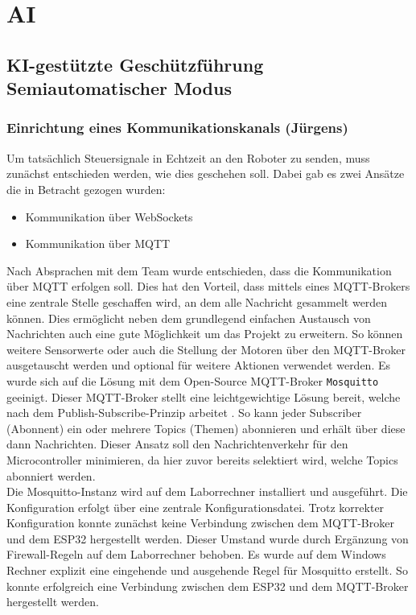 \chapter{AI}

\section{KI-gestützte Geschützführung Semiautomatischer Modus}
\subsection{Einrichtung eines Kommunikationskanals (Jürgens)}
Um tatsächlich Steuersignale in Echtzeit an den Roboter zu senden, muss zunächst entschieden werden, wie dies geschehen soll. Dabei gab es zwei Ansätze die in Betracht gezogen wurden: 
\begin{itemize}
    \item Kommunikation über WebSockets
    \item Kommunikation über MQTT
\end{itemize}
Nach Absprachen mit dem Team wurde entschieden, dass die Kommunikation über MQTT erfolgen soll. Dies hat den Vorteil, dass mittels eines MQTT-Brokers eine zentrale Stelle geschaffen wird, an dem alle Nachricht gesammelt werden können. Dies ermöglicht neben dem grundlegend einfachen Austausch von Nachrichten auch eine gute Möglichkeit um das Projekt zu erweitern. So können weitere Sensorwerte oder auch die Stellung der Motoren über den MQTT-Broker ausgetauscht werden und optional für weitere Aktionen verwendet werden. Es wurde sich auf die Lösung mit dem Open-Source MQTT-Broker \texttt{Mosquitto} geeinigt. Dieser MQTT-Broker stellt eine leichtgewichtige Lösung bereit, welche nach dem Publish-Subscribe-Prinzip arbeitet \cite{Mosquitto}. So kann jeder Subscriber (Abonnent) ein oder mehrere Topics (Themen) abonnieren und erhält über diese dann Nachrichten. Dieser Ansatz soll den Nachrichtenverkehr für den Microcontroller minimieren, da hier zuvor bereits selektiert wird, welche Topics abonniert werden. 
\\ 
Die Mosquitto-Instanz wird auf dem Laborrechner installiert und ausgeführt. Die Konfiguration erfolgt über eine zentrale Konfigurationsdatei. Trotz korrekter Konfiguration konnte zunächst keine Verbindung zwischen dem MQTT-Broker und dem ESP32 hergestellt werden. Dieser Umstand wurde durch Ergänzung von Firewall-Regeln auf dem Laborrechner behoben. Es wurde auf dem Windows Rechner explizit eine eingehende und ausgehende Regel für Mosquitto erstellt. So konnte erfolgreich eine Verbindung zwischen dem ESP32 und dem MQTT-Broker hergestellt werden.